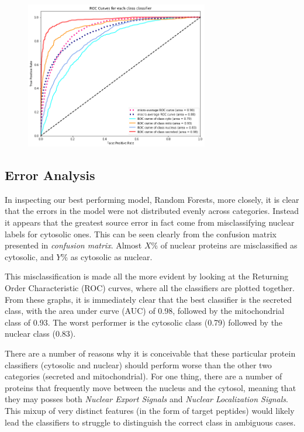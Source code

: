 \documentclass{bioinfo}
\begin{document}
\begin{figure}[!h]
\includegraphics[width=8cm]{roc_curve}
\centering
\end{figure}

\subsection{Error Analysis}

In inspecting our best performing model, Random Forests, more closely, it is clear that the errors in the model were not distributed evenly across categories.
Instead it appears that the greatest source error in fact come from misclassifying nuclear labels for cytosolic ones. This can be seen clearly from the confusion matrix presented in \textit{confusion matrix}. Almost $X\%$ of nuclear proteins are misclassified as cytosolic, and $Y\%$ as cytosolic as nuclear.

This misclassification is made all the more evident by looking at the Returning Order Characteristic (ROC) curves, where all the classifiers are plotted together. 
From these graphs, it is immediately clear that the best classifier is the secreted class, with the area under curve (AUC) of 0.98, followed by the mitochondrial class of 0.93. The worst performer is the cytosolic class (0.79) followed by the nuclear class (0.83).

There are a number of reasons why it is conceivable that these particular protein classifiers (cytosolic and nuclear) should perform worse than the other two categories (secreted and mitochondrial). 
For one thing, there are a number of proteins that frequently move between the nucleus and the cytosol, meaning that they may posses both \textit{Nuclear Export Signals} and \textit{Nuclear Localization Signals}. 
This mixup of very distinct features (in the form of target peptides) would likely lead the classifiers to struggle to distinguish the correct class in ambiguous cases.
\end{document}
